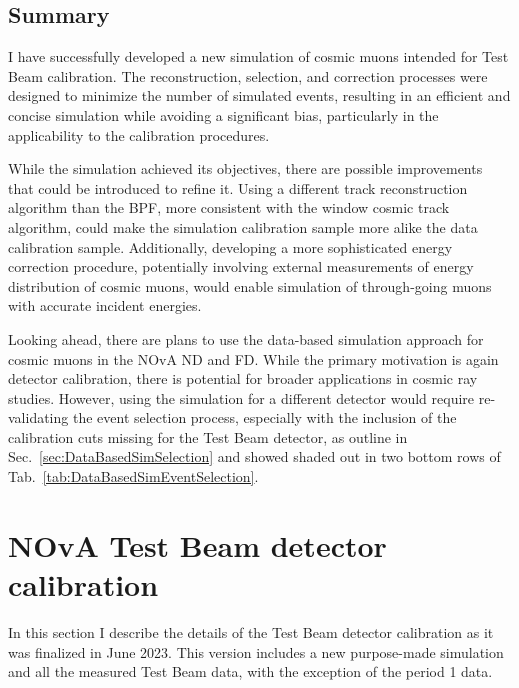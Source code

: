 \subsection{Summary}
I have successfully developed a new simulation of cosmic muons intended for Test Beam calibration. The reconstruction, selection, and correction processes were designed to minimize the number of simulated events, resulting in an efficient and concise simulation while avoiding a significant bias, particularly in the applicability to the calibration procedures.

While the simulation achieved its objectives, there are possible improvements that could be introduced to refine it. Using a different track reconstruction algorithm than the \gls{BPF}, more consistent with the window cosmic track algorithm, could make the simulation calibration sample more alike the data calibration sample. Additionally, developing a more sophisticated energy correction procedure, potentially involving external measurements of energy distribution of cosmic muons, would enable simulation of through-going muons with accurate incident energies.

Looking ahead, there are plans to use the data-based simulation approach for cosmic muons in the \gls{NOvA} \gls{ND} and \gls{FD}. While the primary motivation is again detector calibration, there is potential for broader applications in cosmic ray studies. However, using the simulation for a different detector would require re-validating the event selection process, especially with the inclusion of the calibration cuts missing for the Test Beam detector, as outline in Sec.~\ref{sec:DataBasedSimSelection} and showed shaded out in two bottom rows of Tab.~\ref{tab:DataBasedSimEventSelection}.

\section{NOvA Test Beam detector calibration}\label{sec:TBCalibrationSection}
In this section I describe the details of the Test Beam detector calibration as it was finalized in June 2023. This version includes a new purpose-made simulation and all the measured Test Beam data, with the exception of the period 1 data.

